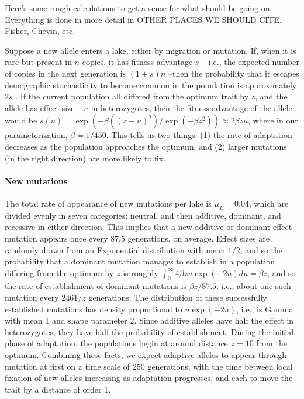 \documentclass{article}
\begin{document}
Here's some rough calculations to get a sense for what should be going on. Everything is done in more detail in OTHER PLACES WE SHOULD CITE.
Fisher, Chevin, etc.

Suppose a new allele enters a lake, either by migration or mutation. If, when it is rare but present in $n$ copies, it has fitness advantage $s$ -- i.e., the expected number of copies in the next generation is $(1+s)n$ --then the probability that it escapes demographic stochasticity to become common in the population is approximately $2s$ \citep{fisher,prob_fixation}. If the current population all differed from the optimum trait by $z$, and the allele has effect size $-u$ in heterozygotes, then the fitness advantage of the allele would be $s(u) = \exp(-\beta((z - u)^2) / \exp( - \beta z^2)) \approx 2 \beta z u$, where in our parameterization, $\beta = 1 / 450$. This tells us two things: (1) the rate of adaptation decreases as the population approaches the optimum, and (2) larger mutations (in the right direction) are more likely to fix.

\paragraph{New mutations}
The total rate of appearance of new mutations per lake is $\mu_L = 0.04$, which are divided evenly in seven categories: neutral, and then additive, dominant, and recessive in either direction. This implies that a new additive or dominant effect mutation appears once every 87.5 generations, on average. Effect sizes are randomly drawn from an Exponential distribution with mean $1/2$, and so the probability that a dominant mutation manages to establish in a population differing from the optimum by $z$ is roughly $\int_0^\infty 4 \beta z u \exp(-2u) du = \beta z$, and so the rate of establishment of dominant mutations is $\beta z / 87.5$, i.e., about one such mutation every $2461/z$ generations. The distribution of these successfully established mutations  has density proportional to $u \exp(-2u)$, i.e., is Gamma with mean 1 and shape parameter 2. Since additive alleles have half the effect in heterozygotes, they have half the probability of establishment. During the initial phase of adaptation, the populations begin at around distance $z=10$ from the optimum. Combining these facts, we expect adaptive alleles to appear through mutation at first on a time scale of 250 generations, with the time between local fixation of new alleles increasing as adaptation progresses, and each to move the trait by a distance of order 1.
\end{document}

